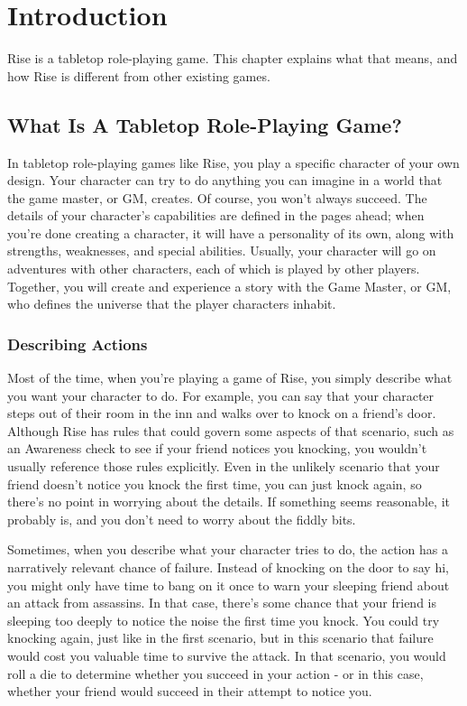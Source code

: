 \chapter{Introduction}

Rise is a tabletop role-playing game.
This chapter explains what that means, and how Rise is different from other existing games.

\section{What Is A Tabletop Role-Playing Game?}
    In tabletop role-playing games like Rise, you play a specific character of your own design.
    Your character can try to do anything you can imagine in a world that the game master, or GM, creates.
    Of course, you won't always succeed.
    The details of your character's capabilities are defined in the pages ahead; when you're done creating a character, it will have a personality of its own, along with strengths, weaknesses, and special abilities.
    Usually, your character will go on adventures with other characters, each of which is played by other players.
    Together, you will create and experience a story with the Game Master, or GM, who defines the universe that the player characters inhabit.

    \subsection{Describing Actions}
        Most of the time, when you're playing a game of Rise, you simply describe what you want your character to do.
        For example, you can say that your character steps out of their room in the inn and walks over to knock on a friend's door.
        Although Rise has rules that could govern some aspects of that scenario, such as an Awareness check to see if your friend notices you knocking, you wouldn't usually reference those rules explicitly.
        Even in the unlikely scenario that your friend doesn't notice you knock the first time, you can just knock again, so there's no point in worrying about the details.
        If something seems reasonable, it probably is, and you don't need to worry about the fiddly bits.

        Sometimes, when you describe what your character tries to do, the action has a narratively relevant chance of failure.
        Instead of knocking on the door to say hi, you might only have time to bang on it once to warn your sleeping friend about an attack from assassins.
        In that case, there's some chance that your friend is sleeping too deeply to notice the noise the first time you knock.
        You could try knocking again, just like in the first scenario, but in this scenario that failure would cost you valuable time to survive the attack.
        In that scenario, you would roll a die to determine whether you succeed in your action - or in this case, whether your friend would succeed in their attempt to notice you.

